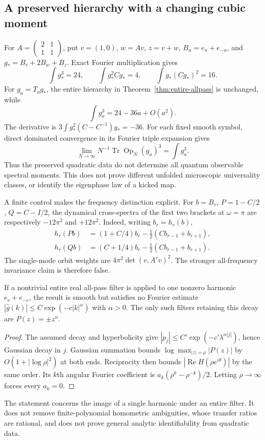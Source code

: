 \subsection{A preserved hierarchy with a changing cubic moment}
For $A=\left(\begin{smallmatrix}2&1\\1&1\end{smallmatrix}\right)$, put
$v=(1,0)$, $w=Av$, $z=v+w$, $B_u=e_u+e_{-u}$, and
$g_*=B_v+2B_w+B_z$. Exact Fourier multiplication gives
\[
 \int g_*^3=24,\qquad \int g_*^2Cg_*=4,
 \qquad \int g_*(Cg_*)^2=16.
\]
For $g_a=T_ag_*$, the entire hierarchy in
Theorem~\ref{thm:entire-allpass} is unchanged, while
\[
 \int g_a^3=24-36a+O(a^2).
\]
The derivative is $3\int g_*^2(C-C^{-1})g_*=-36$.
For each fixed smooth symbol, direct dominated convergence in its Fourier
triple expansion gives
\[
 \lim_{N\to\infty}N^{-1}\operatorname{Tr}\operatorname{Op}_N(g_a)^3
       =\int g_a^3.
\]
Thus the preserved quadratic data do not determine all quantum observable
spectral moments. This does not prove different unfolded microscopic
universality classes, or identify the eigenphase law of a kicked map.

A finite control makes the frequency distinction explicit. For
$b=B_v$, $P=1-C/2$, $Q=C-I/2$, the dynamical cross-spectra of the first two
brackets at $\omega=\pi$ are respectively $-12\pi^2$ and $+12\pi^2$.
Indeed, writing $b_r=h_r(b)$,
\begin{align*}
 h_r(Pb)&=(1+C/4)b_r-\tfrac12(Cb_{r-1}+b_{r+1}),\\
 h_r(Qb)&=(C+1/4)b_r-\tfrac12(Cb_{r-1}+b_{r+1}).
\end{align*}
The single-mode orbit weights are $4\pi^2\det(v,A^rv)^2$.
The stronger all-frequency invariance claim is therefore false.

\begin{theorem}\label{thm:gauge-gevrey}
If a nontrivial entire real all-pass filter is applied to one nonzero
harmonic $e_v+e_{-v}$, the result is smooth but satisfies no Fourier estimate
$|\widehat g(k)|\le C\exp(-c|k|^\alpha)$ with $\alpha>0$.
The only such filters retaining this decay are $P(z)=\pm z^n$.
\end{theorem}
\begin{proof}
The assumed decay and hyperbolicity give
$|p_j|\le C'\exp(-c'\lambda^{\alpha|j|})$, hence Gaussian decay in $j$.
Gaussian summation bounds $\log\max_{|z|=\rho}|P(z)|$ by
$O(1+|\log\rho|^2)$ at both ends. Reciprocity then bounds
$|\operatorname{Re}H(\rho e^{i\theta})|$ by the same order.
Its $k$th angular Fourier coefficient is
$a_k(\rho^k-\rho^{-k})/2$. Letting $\rho\to\infty$ forces every $a_k=0$.
\end{proof}
The statement concerns the image of a single harmonic under an entire
filter. It does not remove finite-polynomial homometric ambiguities, whose
transfer ratios are rational, and does not prove general analytic
identifiability from quadratic data.
